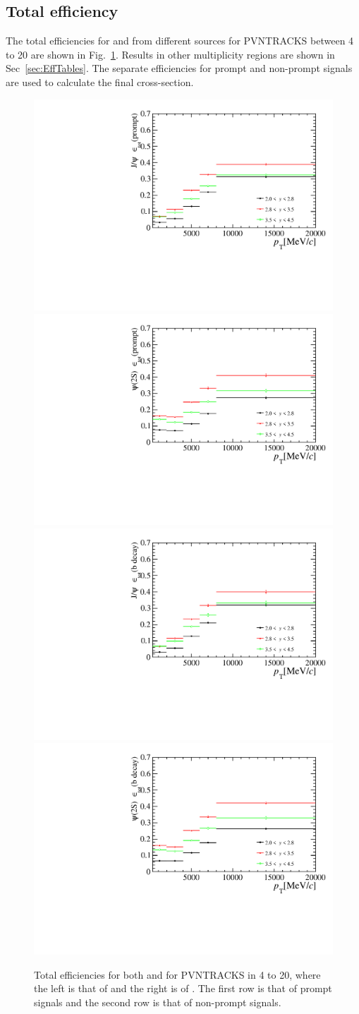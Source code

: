 \subsection{Total efficiency}
The total efficiencies \effTot for \jpsi and \psitwos from different sources for PVNTRACKS between 4 to 20 are shown in Fig.~\ref{EffTot}. Results in other multiplicity regions are shown in Sec~\ref{sec:EffTables}.
The separate efficiencies for prompt and non-prompt signals are used to calculate the final cross-section.
\begin{figure}[!tbp]
  \begin{center}
    \includegraphics[width=0.49\linewidth]{pdf/Jpsi/eff_tot/n1_prompt_point.pdf}
    \includegraphics[width=0.49\linewidth]{pdf/Psi2S/eff_tot/n1_prompt_point.pdf}
    \vspace*{-0.5cm}
    \includegraphics[width=0.49\linewidth]{pdf/Jpsi/eff_tot/n1_fromb_point.pdf}
    \includegraphics[width=0.49\linewidth]{pdf/Psi2S/eff_tot/n1_fromb_point.pdf}
  \end{center}
  \caption{
    Total efficiencies for both \jpsi and \psitwos for PVNTRACKS in 4 to 20, where the 
    left is that of \jpsi and the right is of \psitwos. The first row is that of prompt signals and the 
    second row is that of non-prompt signals.}
  \label{EffTot}
\end{figure}

